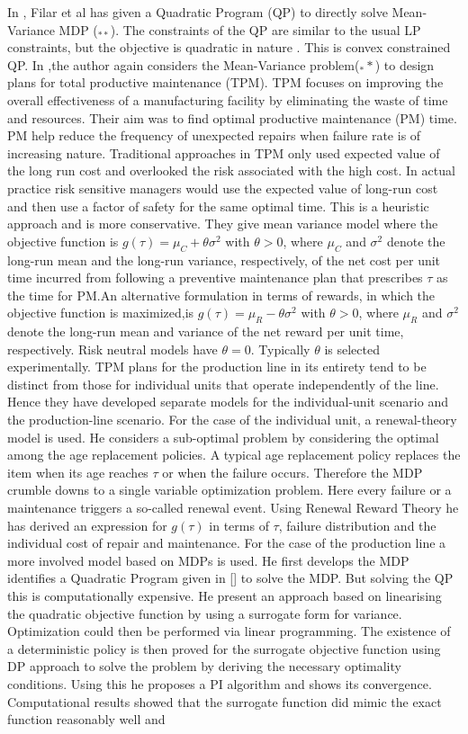 \documentclass[12pt,a4paper,oneside]{report}
\begin{document}
In \citep{filar1989variance}, Filar et al has given a Quadratic Program (QP) to directly solve Mean-Variance MDP ($_{**}$). The constraints of the QP are similar to the usual LP constraints, but the objective is quadratic in nature \cite[equations(2.9)]{filar1989variance}. This is convex constrained QP.
In \cite{gosavi2006risk},the author again considers the Mean-Variance problem($_**$) to design plans for total productive maintenance (TPM). TPM  focuses on improving the overall effectiveness of a manufacturing facility by eliminating the waste of time and resources. Their aim was to find optimal productive maintenance (PM) time. PM help reduce the frequency of unexpected repairs when failure rate is of increasing nature. Traditional approaches in TPM only used expected value of the long run cost and overlooked the risk associated with the high cost. In actual practice risk sensitive managers would use the expected value of long-run cost and then use a factor of safety for the same optimal time. This is a heuristic approach and is more conservative. They give mean variance model where the objective function is $g(\tau)= \mu_C+ \theta {\sigma}^2$ with $\theta>0$, where $\mu_C$ and $\sigma^2$ denote the long-run mean and the long-run variance, respectively, of the net cost per unit time incurred from following a preventive maintenance plan that prescribes $\tau$ as the time for PM.An alternative formulation in terms of rewards, in which the objective function is maximized,is $g(\tau)= \mu_R- \theta {\sigma}^2$ with $\theta>0$, where $\mu_R$ and $\sigma^2$ denote the long-run mean and variance of the net reward per unit time, respectively. Risk neutral models have $\theta =0$. Typically $\theta$ is selected experimentally. TPM plans for the production line in its entirety tend to be distinct from those for individual units that operate independently of the line. Hence they have developed separate models for the individual-unit scenario and the production-line scenario. For the case of the individual unit, a renewal-theory model is used. He considers a sub-optimal problem by considering the optimal among the age replacement policies. A typical age replacement policy replaces the item when its age reaches $\tau$ or when the failure occurs. Therefore the MDP crumble downs to a single variable optimization problem. Here every failure or a maintenance triggers a so-called renewal event. Using Renewal Reward Theory he has derived an expression for $g(\tau)$ in terms of $\tau$, failure distribution and the individual cost of repair and maintenance. For the case of the production line a more involved model based on MDPs is used. He first develops the MDP identifies a Quadratic Program given in [] to solve the MDP. But solving the QP this is computationally expensive. He present an approach based on linearising the quadratic objective function by using a surrogate form for variance. Optimization could then be performed via linear programming. The existence of a deterministic policy is then proved for the surrogate objective function using DP approach to solve the problem by deriving the necessary optimality conditions. Using this he proposes a PI algorithm and shows its convergence. Computational results showed that the surrogate function did mimic the exact function reasonably well and 
\end{document}
